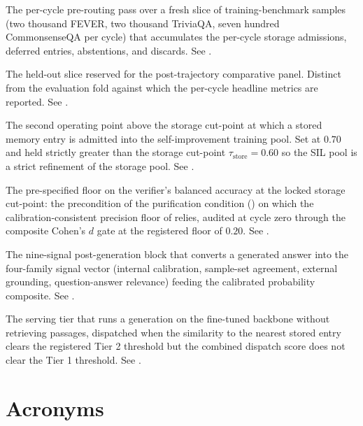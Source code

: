 \begin{description}[style=nextline, leftmargin=0pt, labelindent=0pt, itemsep=6pt, parsep=0pt, font=\bfseries, beginpenalty=10000]
\item[Stream chunk.] The per-cycle pre-routing pass over a fresh slice of training-benchmark samples (two thousand FEVER, two thousand TriviaQA, seven hundred CommonsenseQA per cycle) that accumulates the per-cycle storage admissions, deferred entries, abstentions, and discards. See .

\item[Test fold.] The held-out slice reserved for the post-trajectory comparative panel. Distinct from the evaluation fold against which the per-cycle headline metrics are reported. See .

\item[Training-pool admission threshold (\boldmath$\tau_{\text{train}}$).] The second operating point above the storage cut-point at which a stored memory entry is admitted into the self-improvement training pool. Set at $0.70$ and held strictly greater than the storage cut-point $\tau_{\text{store}} = 0.60$ so the SIL pool is a strict refinement of the storage pool. See .

\item[Verifier-balanced-accuracy precondition.] The pre-specified floor on the verifier's balanced accuracy at the locked storage cut-point: the precondition of the purification condition () on which the calibration-consistent precision floor of  relies, audited at cycle zero through the composite Cohen's $d$ gate at the registered floor of $0.20$. See .

\item[Verifier ensemble.] The nine-signal post-generation block that converts a generated answer into the four-family signal vector (internal calibration, sample-set agreement, external grounding, question-answer relevance) feeding the calibrated probability composite. See .

\item[Zero-shot tier (Tier 2).] The serving tier that runs a generation on the fine-tuned backbone without retrieving passages, dispatched when the similarity to the nearest stored entry clears the registered Tier 2 threshold but the combined dispatch score does not clear the Tier 1 threshold. See .

\end{description}

\section{Acronyms}

